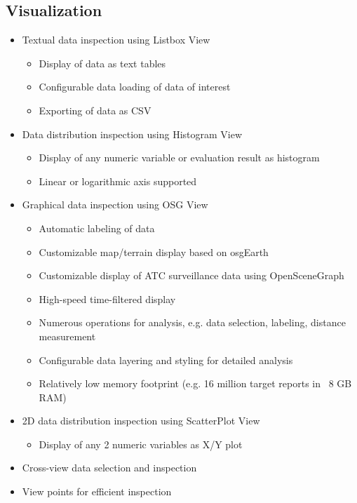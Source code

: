 \subsection{Visualization}
\begin{itemize}  
    \item Textual data inspection using Listbox View
    \begin{itemize}  
        \item Display of data as text tables
        \item Configurable data loading of data of interest
        \item Exporting of data as CSV
    \end{itemize}
    \item Data distribution inspection using Histogram View
    \begin{itemize}  
        \item Display of any numeric variable or evaluation result as histogram
        \item Linear or logarithmic axis supported
    \end{itemize}
    \item Graphical data inspection using OSG View
    \begin{itemize}  
        \item Automatic labeling of data
        \item Customizable map/terrain display based on osgEarth
        \item Customizable display of ATC surveillance data using OpenSceneGraph
        \item High-speed time-filtered display
        \item Numerous operations for analysis, e.g. data selection, labeling, distance measurement
        \item Configurable data layering and styling for detailed analysis
        \item Relatively low memory footprint (e.g. 16 million target reports in ~8 GB RAM)
    \end{itemize}    
    \item 2D data distribution inspection using ScatterPlot View
    \begin{itemize}  
        \item Display of any 2 numeric variables as X/Y plot
    \end{itemize}
    \item Cross-view data selection and inspection
    \item View points for efficient inspection
\end{itemize}


